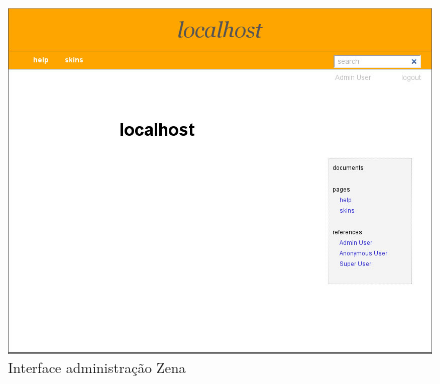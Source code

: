 \begin{figure}[here]
\includegraphics[width=150mm]{images/zena.jpg}
\caption{Interface administração Zena}
\label{fig:zena_admin.png}
\end{figure}


